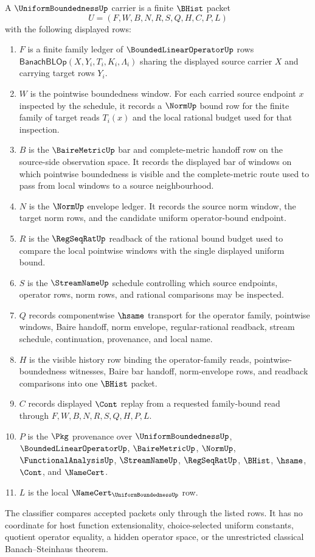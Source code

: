 \begin{definition}
\label{def:uniform-boundedness-carrier}
A $\UniformBoundednessUp$ carrier is a finite $\BHist$ packet
$$
U=(F,W,B,N,R,S,Q,H,C,P,L)
$$
with the following displayed rows:
\begin{enumerate}
\item $F$ is a finite family ledger of $\BoundedLinearOperatorUp$ rows $\mathsf{BanachBLOp}(X,Y_i,T_i,K_i,\Lambda_i)$ sharing the displayed source carrier $X$ and carrying target rows $Y_i$.
\item $W$ is the pointwise boundedness window. For each carried source endpoint $x$ inspected by the schedule, it records a $\NormUp$ bound row for the finite family of target reads $T_i(x)$ and the local rational budget used for that inspection.
\item $B$ is the $\BaireMetricUp$ bar and complete-metric handoff row on the source-side observation space. It records the displayed bar of windows on which pointwise boundedness is visible and the complete-metric route used to pass from local windows to a source neighbourhood.
\item $N$ is the $\NormUp$ envelope ledger. It records the source norm window, the target norm rows, and the candidate uniform operator-bound endpoint.
\item $R$ is the $\RegSeqRatUp$ readback of the rational bound budget used to compare the local pointwise windows with the single displayed uniform bound.
\item $S$ is the $\StreamNameUp$ schedule controlling which source endpoints, operator rows, norm rows, and rational comparisons may be inspected.
\item $Q$ records componentwise $\hsame$ transport for the operator family, pointwise windows, Baire handoff, norm envelope, regular-rational readback, stream schedule, continuation, provenance, and local name.
\item $H$ is the visible history row binding the operator-family reads, pointwise-boundedness witnesses, Baire bar handoff, norm-envelope rows, and readback comparisons into one $\BHist$ packet.
\item $C$ records displayed $\Cont$ replay from a requested family-bound read through $F,W,B,N,R,S,Q,H,P,L$.
\item $P$ is the $\Pkg$ provenance over $\UniformBoundednessUp$, $\BoundedLinearOperatorUp$, $\BaireMetricUp$, $\NormUp$, $\FunctionalAnalysisUp$, $\StreamNameUp$, $\RegSeqRatUp$, $\BHist$, $\hsame$, $\Cont$, and $\NameCert$.
\item $L$ is the local $\NameCert_{\UniformBoundednessUp}$ row.
\end{enumerate}
The classifier compares accepted packets only through the listed rows. It has no coordinate for host function extensionality, choice-selected uniform constants, quotient operator equality, a hidden operator space, or the unrestricted classical Banach--Steinhaus theorem.
\end{definition}

